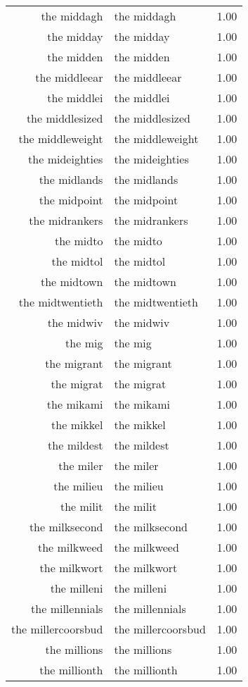 \begin{table}[ht]
\begin{tabular}{rlr}
  the middagh & the middagh & 1.00 \\ 
  the midday & the midday & 1.00 \\ 
  the midden & the midden & 1.00 \\ 
  the middleear & the middleear & 1.00 \\ 
  the middlei & the middlei & 1.00 \\ 
  the middlesized & the middlesized & 1.00 \\ 
  the middleweight & the middleweight & 1.00 \\ 
  the mideighties & the mideighties & 1.00 \\ 
  the midlands & the midlands & 1.00 \\ 
  the midpoint & the midpoint & 1.00 \\ 
  the midrankers & the midrankers & 1.00 \\ 
  the midto & the midto & 1.00 \\ 
  the midtol & the midtol & 1.00 \\ 
  the midtown & the midtown & 1.00 \\ 
  the midtwentieth & the midtwentieth & 1.00 \\ 
  the midwiv & the midwiv & 1.00 \\ 
  the mig & the mig & 1.00 \\ 
  the migrant & the migrant & 1.00 \\ 
  the migrat & the migrat & 1.00 \\ 
  the mikami & the mikami & 1.00 \\ 
  the mikkel & the mikkel & 1.00 \\ 
  the mildest & the mildest & 1.00 \\ 
  the miler & the miler & 1.00 \\ 
  the milieu & the milieu & 1.00 \\ 
  the milit & the milit & 1.00 \\ 
  the milksecond & the milksecond & 1.00 \\ 
  the milkweed & the milkweed & 1.00 \\ 
  the milkwort & the milkwort & 1.00 \\ 
  the milleni & the milleni & 1.00 \\ 
  the millennials & the millennials & 1.00 \\ 
  the millercoorsbud & the millercoorsbud & 1.00 \\ 
  the millions & the millions & 1.00 \\ 
  the millionth & the millionth & 1.00 \\ 

\end{tabular}
\end{table}
